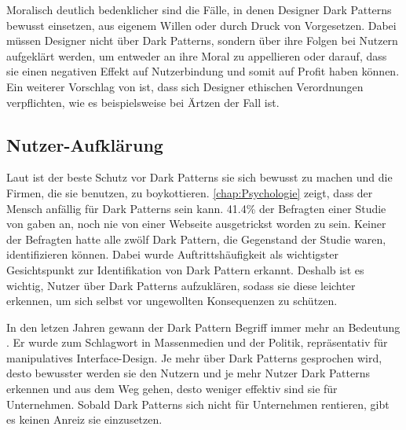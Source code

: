 \documentclass[conference,compsoc,final,a4paper]{IEEEtran}
\begin{document}
Moralisch deutlich bedenklicher sind die Fälle, in denen Designer Dark Patterns bewusst einsetzen, aus eigenem Willen oder durch Druck von Vorgesetzen. Dabei müssen Designer nicht über Dark Patterns, sondern über ihre Folgen bei Nutzern aufgeklärt werden, um entweder an ihre Moral zu appellieren oder darauf, dass sie einen negativen Effekt auf Nutzerbindung und somit auf Profit haben können. Ein weiterer Vorschlag von \citeauthor*{Gray_2018} \autocite{Gray_2018} ist, dass sich Designer ethischen Verordnungen verpflichten, wie es beispielsweise bei Ärtzen der Fall ist. 

\subsection{Nutzer-Aufklärung}
Laut \citeauthor{Brignull} \autocite{Brignull} ist der beste Schutz vor Dark Patterns sie sich bewusst zu machen und die Firmen, die sie benutzen, zu boykottieren. \autoref{chap:Psychologie} zeigt, dass der Mensch anfällig für Dark Patterns sein kann. 41.4\% der Befragten einer Studie von \citeauthor{M.Bhoot2020} \autocite{M.Bhoot2020} gaben an, noch nie von einer Webseite ausgetrickst worden zu sein. Keiner der Befragten hatte alle zwölf Dark Pattern, die Gegenstand der Studie waren, identifizieren können. Dabei wurde Auftrittshäufigkeit als wichtigster Gesichtspunkt zur Identifikation von Dark Pattern erkannt. Deshalb ist es wichtig, Nutzer über Dark Patterns aufzuklären, sodass sie diese leichter erkennen, um sich selbst vor ungewollten Konsequenzen zu schützen.

In den letzen Jahren gewann der Dark Pattern Begriff immer mehr an Bedeutung \autocite{Chivukula_2019}. Er wurde zum Schlagwort in Massenmedien und der Politik, repräsentativ für manipulatives Interface-Design. Je mehr über Dark Patterns gesprochen wird, desto bewusster werden sie den Nutzern und je mehr Nutzer Dark Patterns erkennen und aus dem Weg gehen, desto weniger effektiv sind sie für Unternehmen. Sobald Dark Patterns sich nicht für Unternehmen rentieren, gibt es keinen Anreiz sie einzusetzen.
\end{document}
